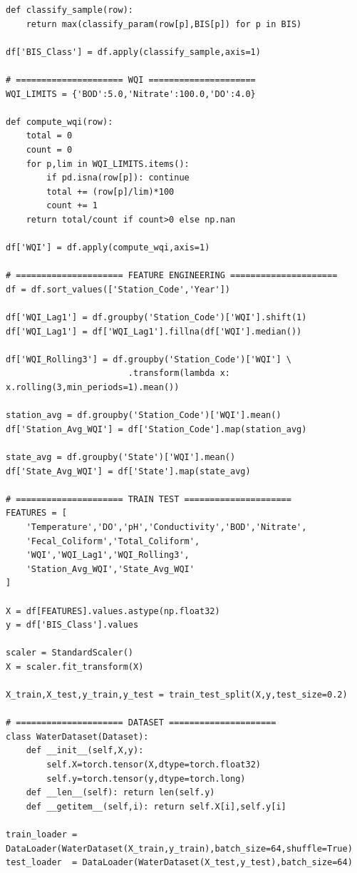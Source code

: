 \documentclass[12pt,a4paper]{report}
\numberwithin{table}{chapter}
\numberwithin{figure}{chapter}
\begin{document}
\begin{verbatim}
def classify_sample(row):
    return max(classify_param(row[p],BIS[p]) for p in BIS)

df['BIS_Class'] = df.apply(classify_sample,axis=1)

# ===================== WQI =====================
WQI_LIMITS = {'BOD':5.0,'Nitrate':100.0,'DO':4.0}

def compute_wqi(row):
    total = 0
    count = 0
    for p,lim in WQI_LIMITS.items():
        if pd.isna(row[p]): continue
        total += (row[p]/lim)*100
        count += 1
    return total/count if count>0 else np.nan

df['WQI'] = df.apply(compute_wqi,axis=1)

# ===================== FEATURE ENGINEERING =====================
df = df.sort_values(['Station_Code','Year'])

df['WQI_Lag1'] = df.groupby('Station_Code')['WQI'].shift(1)
df['WQI_Lag1'] = df['WQI_Lag1'].fillna(df['WQI'].median())

df['WQI_Rolling3'] = df.groupby('Station_Code')['WQI'] \
                        .transform(lambda x: x.rolling(3,min_periods=1).mean())

station_avg = df.groupby('Station_Code')['WQI'].mean()
df['Station_Avg_WQI'] = df['Station_Code'].map(station_avg)

state_avg = df.groupby('State')['WQI'].mean()
df['State_Avg_WQI'] = df['State'].map(state_avg)

# ===================== TRAIN TEST =====================
FEATURES = [
    'Temperature','DO','pH','Conductivity','BOD','Nitrate',
    'Fecal_Coliform','Total_Coliform',
    'WQI','WQI_Lag1','WQI_Rolling3',
    'Station_Avg_WQI','State_Avg_WQI'
]

X = df[FEATURES].values.astype(np.float32)
y = df['BIS_Class'].values

scaler = StandardScaler()
X = scaler.fit_transform(X)

X_train,X_test,y_train,y_test = train_test_split(X,y,test_size=0.2)

# ===================== DATASET =====================
class WaterDataset(Dataset):
    def __init__(self,X,y):
        self.X=torch.tensor(X,dtype=torch.float32)
        self.y=torch.tensor(y,dtype=torch.long)
    def __len__(self): return len(self.y)
    def __getitem__(self,i): return self.X[i],self.y[i]

train_loader = DataLoader(WaterDataset(X_train,y_train),batch_size=64,shuffle=True)
test_loader  = DataLoader(WaterDataset(X_test,y_test),batch_size=64)


\end{verbatim}
\end{document}
